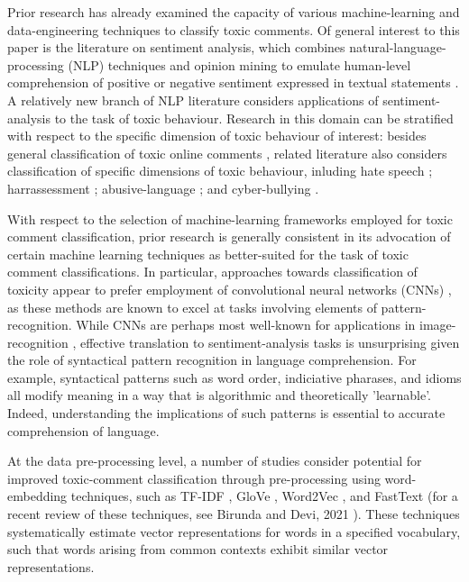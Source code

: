 
Prior research has already examined the capacity of various machine-learning and data-engineering techniques to classify toxic comments. 
Of general interest to this paper is the literature on sentiment analysis, which combines natural-language-processing (NLP) techniques and opinion mining to emulate human-level comprehension of positive or negative sentiment expressed in textual statements \cite{chowdhary2020natural, cambria2014jumping}.
A relatively new branch of NLP literature considers applications of sentiment-analysis to the task of toxic behaviour. 
Research in this domain can be stratified with respect to the specific dimension of toxic behaviour of interest: besides general classification of toxic online comments \cite{georgakopoulos2018convolutional,van2018challenges,risch2020toxic}, related literature also considers classification of specific dimensions of toxic behaviour, inluding hate speech \cite{mullah2021advances, ayo2020machine, rizos2019augment, yang2019exploring}; harrassessment \cite{abarna2022identification, basu2021cyberpolice, marwa2018deep}; abusive-language \cite{vidgen2020directions, nobata2016abusive, bourgonje2017automatic}; and cyber-bullying \cite{kanan2020cyber, akhter2019cyber, di2016unsupervised}.

With respect to the selection of machine-learning frameworks employed for toxic comment classification, prior research is generally consistent in its advocation of certain machine learning techniques as better-suited for the task of toxic comment classifications. In particular, approaches towards classification of toxicity appear to prefer employment of convolutional neural networks (CNNs) \cite{androcec2020machine}, as these methods are known to excel at tasks involving elements of pattern-recognition. While CNNs are perhaps most well-known for applications in image-recognition \cite{rawat2017deep}, effective translation to sentiment-analysis tasks is unsurprising given the role of syntactical pattern recognition in language comprehension. For example, syntactical patterns such as word order, indiciative pharases, and idioms all modify meaning in a way that is algorithmic and theoretically 'learnable'. Indeed, understanding the implications of such patterns is essential to accurate comprehension of language. 

At the data pre-processing level, a number of studies consider potential for improved toxic-comment classification through pre-processing using  word-embedding techniques, such as TF-IDF \cite{luhn1957statistical, jones1972statistical}, GloVe \cite{pennington2014glove}, Word2Vec \cite{mikolov2013efficient,mikolov2013distributed}, and FastText \cite{bojanowski2017enriching, joulin2016bag, joulin2016fasttext} (for a recent review of these techniques, see Birunda and Devi, 2021 \cite{selva2021review}). These techniques systematically estimate vector representations for words in a specified vocabulary, such that words arising from common contexts exhibit similar vector representations.


